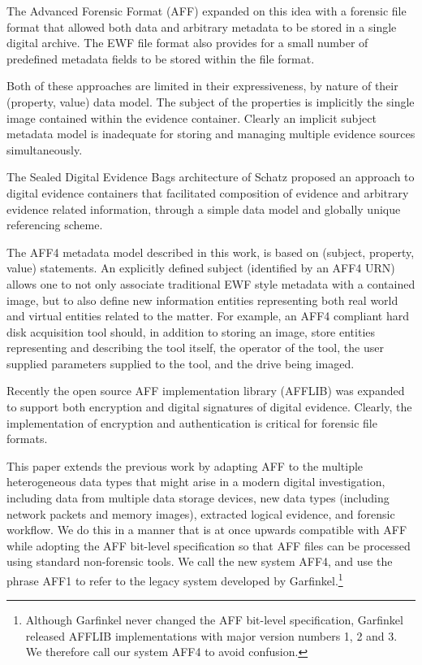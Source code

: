 \documentclass[10pt, conference]{IEEEtran}
\begin{document}
The Advanced Forensic Format (AFF) expanded on this idea with a
forensic file format that allowed both data and arbitrary metadata to
be stored in a single digital archive\cite{garfinkel:aff}. The EWF
file format also provides for a small number of predefined metadata
fields to be stored within the file format.

Both of these approaches are limited in their expressiveness, by
nature of their (property, value) data model. The subject of the
properties is implicitly the single image contained within the
evidence container. Clearly an implicit subject metadata model is
inadequate for storing and managing multiple evidence sources
simultaneously.

The Sealed Digital Evidence Bags architecture of Schatz proposed an
approach to digital evidence containers that facilitated composition
of evidence and arbitrary evidence related information, through a
simple data model and globally unique referencing
scheme\cite{schatz:sdeb}. 

The AFF4 metadata model described in this work, is based on (subject,
property, value) statements. An explicitly defined subject (identified
by an AFF4 URN) allows one to not only associate traditional EWF style
metadata with a contained image, but to also define new information
entities representing both real world and virtual entities related to
the matter. For example, an AFF4 compliant hard disk acquisition tool
should, in addition to storing an image, store entities representing
and describing the tool itself, the operator of the tool, the user
supplied parameters supplied to the tool, and the drive being imaged.

Recently the open source AFF implementation library (AFFLIB) was
expanded to support both encryption and digital signatures of digital
evidence\cite{garfinkel:affcrypto}. Clearly, the implementation of
encryption and authentication is critical for forensic file formats.

This paper extends the previous work by adapting AFF to the multiple
heterogeneous data types that might arise in a modern digital
investigation, including data from multiple data storage devices, new
data types (including network packets and memory images), extracted
logical evidence, and forensic workflow. We do this in a manner that
is at once upwards compatible with AFF while adopting the AFF
bit-level specification so that AFF files can be processed using
standard non-forensic tools.  We call the new system AFF4, and use the
phrase AFF1 to refer to the legacy system developed by
Garfinkel.\footnote{Although Garfinkel never changed the AFF bit-level
specification, Garfinkel released AFFLIB implementations with major
version numbers 1, 2 and 3. We therefore call our system AFF4 to avoid
confusion.}
\end{document}
